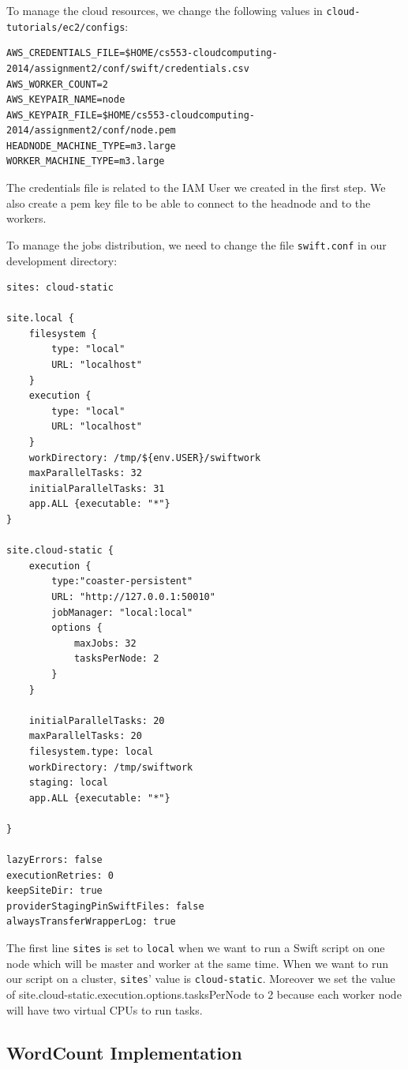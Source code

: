 \documentclass{article}
\begin{document}
To manage the cloud resources, we change the following values in \lstinline|cloud-tutorials/ec2/configs|:

\begin{lstlisting}
AWS_CREDENTIALS_FILE=$HOME/cs553-cloudcomputing-2014/assignment2/conf/swift/credentials.csv
AWS_WORKER_COUNT=2
AWS_KEYPAIR_NAME=node
AWS_KEYPAIR_FILE=$HOME/cs553-cloudcomputing-2014/assignment2/conf/node.pem
HEADNODE_MACHINE_TYPE=m3.large
WORKER_MACHINE_TYPE=m3.large
\end{lstlisting}

The credentials file is related to the IAM User we created in the first step. We also create a pem key file to be able to connect to the headnode and to the workers.

To manage the jobs distribution, we need to change the file \lstinline|swift.conf| in our development directory:

\begin{lstlisting}
sites: cloud-static

site.local {
    filesystem {
        type: "local"
        URL: "localhost"
    }
    execution {
        type: "local"
        URL: "localhost"
    }
    workDirectory: /tmp/${env.USER}/swiftwork
    maxParallelTasks: 32
    initialParallelTasks: 31
    app.ALL {executable: "*"}
}

site.cloud-static {
    execution {
        type:"coaster-persistent"
        URL: "http://127.0.0.1:50010"
        jobManager: "local:local"
        options {
            maxJobs: 32
            tasksPerNode: 2
        }
    }

    initialParallelTasks: 20
    maxParallelTasks: 20
    filesystem.type: local
    workDirectory: /tmp/swiftwork
    staging: local
    app.ALL {executable: "*"}

}

lazyErrors: false
executionRetries: 0
keepSiteDir: true
providerStagingPinSwiftFiles: false
alwaysTransferWrapperLog: true
\end{lstlisting}

The first line \lstinline|sites| is set to \lstinline|local| when we want to run a Swift script on one node which will be master and worker at the same time. When we want to run our script on a cluster, \lstinline|sites|' value is \lstinline|cloud-static|. Moreover we set the value of site.cloud-static.execution.options.tasksPerNode to 2 because each worker node will have two virtual CPUs to run tasks.

\subsection{WordCount Implementation}
\end{document}
